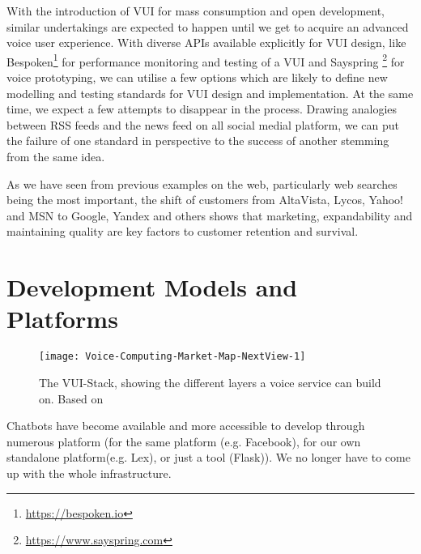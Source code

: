 With the introduction of VUI for mass consumption and open development, similar undertakings are expected to happen \cite{alexapc18} until we get to acquire an advanced voice user experience. With diverse APIs available explicitly for VUI design, like Bespoken\footnote{\url{https://bespoken.io}} for performance monitoring and testing of a VUI and Sayspring \footnote{\url{https://www.sayspring.com}}
for voice prototyping, we can utilise a few options which are likely to define new modelling and testing standards for VUI design and implementation. At the same time, we expect a few attempts to disappear in the process. Drawing analogies between RSS feeds and the news feed on all social medial platform, we can put the failure of one standard in perspective to the success of another stemming from the same idea. 

As we have seen from previous examples on the web, particularly web searches being the most important, the shift of customers from AltaVista, Lycos, Yahoo! and MSN to Google, Yandex and others shows that marketing, expandability and maintaining quality are key factors to customer retention and survival.














\section[Development Models]{Development Models and Platforms}
\label{devmodels}




\begin{wrapfigure}{l}{0.48\textwidth}
	\caption[VUI-Stack]{The VUI-Stack, showing the different layers a voice service can build on. Based on \cite{voicelabs}}
	\label{vuistack}
	\texttt{[image: Voice-Computing-Market-Map-NextView-1]}
\end{wrapfigure}



Chatbots have become available and more accessible to develop through numerous platform (for the same platform (e.g. Facebook), for our own standalone platform(e.g. Lex), or just a tool (Flask)). We no longer have to come up with the whole infrastructure.




